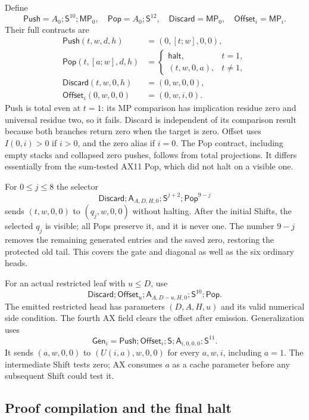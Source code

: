 Define
\[
 \mathsf{Push}=A_0;\mathsf S^{10};\mathsf{MP}_0,
 \quad \mathsf{Pop}=A_0;\mathsf S^{12},
 \quad \mathsf{Discard}=\mathsf{MP}_0,
 \quad \mathsf{Offset}_i=\mathsf{MP}_i.
\]
Their full contracts are
\begin{align*}
 \mathsf{Push}(t,w,d,h)&=(0,[t;w],0,0),\\
 \mathsf{Pop}(t,[a;w],d,h)&=
   \begin{cases}\mathsf{halt},&t=1,\\(t,w,0,a),&t\ne1,\end{cases}\\
 \mathsf{Discard}(t,w,0,h)&=(0,w,0,0),\\
 \mathsf{Offset}_i(0,w,0,0)&=(0,w,i,0).
\end{align*}
Push is total even at $t=1$: its MP comparison has implication residue
zero and universal residue two, so it fails. Discard is independent of
its comparison result because both branches return zero when the target
is zero. Offset uses $I(0,i)>0$ if $i>0$, and the zero alias if $i=0$.
The Pop contract, including empty stacks and collapsed zero pushes, follows
from total projections. It differs essentially from the sum-tested AX11
Pop, which did not halt on a visible one.

For $0\le j\le8$ the selector
\[
 \mathsf{Discard};\mathsf A_{A,D,H,0};
       \mathsf S^{j+2};\mathsf{Pop}^{9-j}
 \label{eq:ax11qh5-selector}
\]
sends $(t,w,0,0)$ to $(q_j,w,0,0)$ without halting. After the initial
Shifts, the selected $q_j$ is visible; all Pops preserve it, and it is
never one. The number $9-j$ removes the remaining generated entries and
the saved zero, restoring the protected old tail. This covers the gate
and diagonal as well as the six ordinary heads.

For an actual restricted leaf with $u\le D$, use
\[
 \mathsf{Discard};\mathsf{Offset}_u;
 \mathsf A_{A,D-u,H,0};\mathsf S^{10};\mathsf{Pop}.
\]
The emitted restricted head has parameters $(D,A,H,u)$ and its valid
numerical side condition. The fourth AX field clears the offset after
emission. Generalization uses
\[
 \mathsf{Gen}_i=\mathsf{Push};\mathsf{Offset}_i;\mathsf S;
          \mathsf A_{i,0,0,0};\mathsf S^{11}.
\]
It sends $(a,w,0,0)$ to $(U(i,a),w,0,0)$ for every $a,w,i$, including
$a=1$. The intermediate Shift tests zero; AX consumes $a$ as a cache
parameter before any subsequent Shift could test it.

\subsection{Proof compilation and the final halt}

